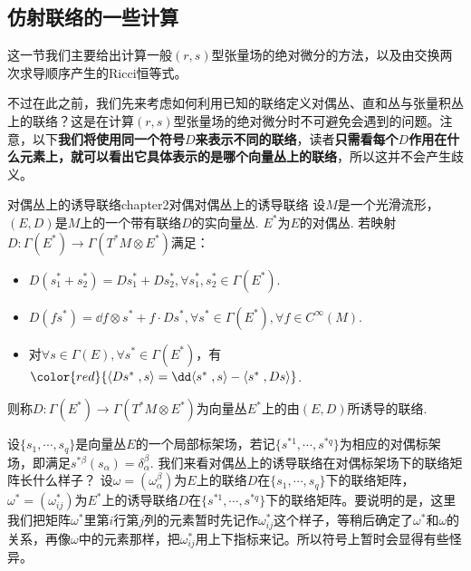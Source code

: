\subsection{仿射联络的一些计算}

这一节我们主要给出计算一般$(r,s)$型张量场的绝对微分的方法，以及由交换两次求导顺序产生的Ricci恒等式。

不过在此之前，我们先来考虑如何利用已知的联络定义对偶丛、直和丛与张量积丛上的联络？这是在计算$(r,s)$型张量场的绝对微分时不可避免会遇到的问题。注意，以下\textbf{我们将使用同一个符号$D$来表示不同的联络}，读者\textbf{只需看每个$D$作用在什么元素上，就可以看出它具体表示的是哪个向量丛上的联络}，所以这并不会产生歧义。

\begin{mydef}{对偶丛上的诱导联络}{chapter2对偶对偶丛上的诱导联络}
	设$M$是一个光滑流形，$(E,D)$是$M$上的一个带有联络$D$的实向量丛. $E^{\ast}$为$E$的对偶丛. 若映射$D:\Gamma(E^{\ast})\longrightarrow \Gamma(T^{\ast}M\otimes E^{\ast})$满足：
	\begin{itemize}
		\item[(1)] $D(s^{\ast}_{1}+s^{\ast}_{2})=Ds^{\ast}_{1}+Ds^{\ast}_{2},\forall s^{\ast}_{1},s^{\ast}_{2}\in \Gamma(E^{\ast})$.
		\item[(2)] $D(f s^{\ast})=\dd f\otimes s^{\ast}+f\cdot Ds^{\ast},\forall s^{\ast}\in \Gamma(E^{\ast}),\forall f\in C^{\infty}(M)$.
		\item[(3)] 对$\forall s\in \Gamma(E),\forall s^{\ast}\in \Gamma(E^{\ast})$，有${\color{red}{\langle D s^{\ast}\;,s \rangle=\dd \langle s^{\ast}\;,s \rangle-\langle s^{\ast} \;,Ds \rangle}}$. 
	\end{itemize}
	则称$D:\Gamma(E^{\ast})\longrightarrow \Gamma(T^{\ast}M\otimes E^{\ast})$为向量丛$E^{\ast}$上的由$(E,D)$所诱导的联络.
\end{mydef}

设$\{s_{1},\cdots,s_{q} \}$是向量丛$E$的一个局部标架场，若记$\{s^{\ast 1},\cdots,s^{\ast q} \}$为相应的对偶标架场，即满足$s^{\ast \beta }(s_{\alpha})=\delta_{\alpha}^{\beta}$. 我们来看对偶丛上的诱导联络在对偶标架场下的联络矩阵长什么样子？
设$\omega=(\omega_{\alpha}^{\beta})$为$E$上的联络$D$在$\{s_{1},\cdots,s_{q} \}$下的联络矩阵，$\omega^{\ast}=(\omega^{\ast}_{ij})$为$E^{\ast}$上的诱导联络$D$在$\{s^{\ast 1},\cdots,s^{\ast q} \}$下的联络矩阵。要说明的是，这里我们把矩阵$\omega^{\ast}$里第$i$行第$j$列的元素暂时先记作$\omega^{\ast}_{ij}$这个样子，等稍后确定了$\omega^{\ast}$和$\omega$的关系，再像$\omega$中的元素那样，把$\omega^{\ast}_{ij}$用上下指标来记。所以符号上暂时会显得有些怪异。

